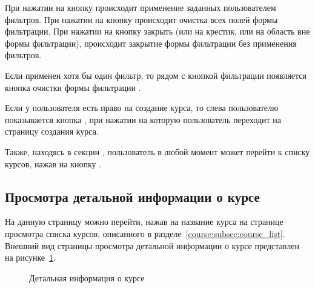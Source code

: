 При нажатии на кнопку  происходит применение заданных пользователем фильтров. При нажатии на кнопку  происходит очистка всех полей формы фильтрации. При нажатии на кнопку закрыть (или на крестик, или на область вне формы фильтрации), происходит закрытие формы фильтрации без применения фильтров.

Если применен хотя бы один фильтр, то рядом с кнопкой фильтрации появляется кнопка очистки формы фильтрации .

Если у пользователя есть право на создание курса, то слева пользователю показывается кнопка
, при нажатии на которую пользователь переходит на страницу создания курса.

Также, находясь в секции , пользователь в любой момент может перейти к списку курсов, нажав на кнопку .

\subsection{Просмотра детальной информации о курсе}
\label{course:subsec:course_detail}
На данную страницу можно перейти, нажав на название курса на странице просмотра списка курсов, описанного в разделе~\ref{course:subsec:course_list}. Внешний вид страницы просмотра детальной информации о курсе представлен на рисунке~\ref{img:course:course_detail}.
\begin{figure}[H]
	\caption{Детальная информация о курсе}
	\label{img:course:course_detail}
\end{figure}

